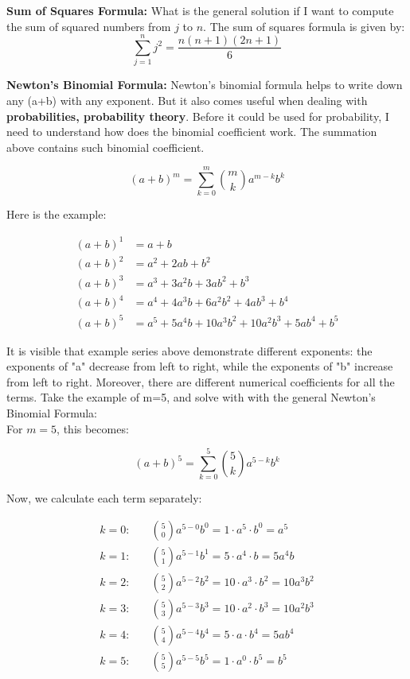 \documentclass{article}
\begin{document}
\vspace{1cm}

\textbf{Sum of Squares Formula: }
What is the general solution if I want to compute the sum of squared numbers from \(j\) to \(n\). The sum of squares formula is given by:
\begin{equation}
\sum_{j=1}^{n} j^2 = \frac{n(n+1)(2n+1)}{6}
\end{equation}

\vspace{1cm}

\textbf{Newton's Binomial Formula:} Newton's binomial formula helps to write down any (a+b) with any exponent. But it also comes useful when dealing with \textbf{probabilities, probability theory}. Before it could be used for probability, I need to understand how does the binomial coefficient work. The summation above contains such binomial coefficient.    

\begin{equation}
(a+b)^m = \sum_{k=0}^{m} \binom{m}{k} a^{m-k} b^{k}
\end{equation}

Here is the example: 

\begin{align*}
(a + b)^1 &= a + b \\
(a + b)^2 &= a^2 + 2ab + b^2 \\
(a + b)^3 &= a^3 + 3a^2b + 3ab^2 + b^3 \\
(a + b)^4 &= a^4 + 4a^3b + 6a^2b^2 + 4ab^3 + b^4 \\
(a + b)^5 &= a^5 + 5a^4b + 10a^3b^2 + 10a^2b^3 + 5ab^4 + b^5
\end{align*}

It is visible that example series above demonstrate different exponents: the exponents of "a" decrease from left to right, while the exponents of "b" increase from left to right. Moreover, there are different numerical coefficients for all the terms. Take the example of m=5, and solve with with the general Newton's Binomial Formula: \\

For \(m = 5\), this becomes:

\begin{equation*}
(a + b)^5 = \sum_{k=0}^{5} \binom{5}{k} a^{5-k} b^{k}
\end{equation*}

Now, we calculate each term separately:

\begin{align*}
k = 0: & \quad \binom{5}{0} a^{5-0} b^{0} = 1 \cdot a^5 \cdot b^0 = a^5 \\[8pt]
k = 1: & \quad \binom{5}{1} a^{5-1} b^{1} = 5 \cdot a^4 \cdot b = 5a^4 b \\[8pt]
k = 2: & \quad \binom{5}{2} a^{5-2} b^{2} = 10 \cdot a^3 \cdot b^2 = 10a^3 b^2 \\[8pt]
k = 3: & \quad \binom{5}{3} a^{5-3} b^{3} = 10 \cdot a^2 \cdot b^3 = 10a^2 b^3 \\[8pt]
k = 4: & \quad \binom{5}{4} a^{5-4} b^{4} = 5 \cdot a \cdot b^4 = 5a b^4 \\[8pt]
k = 5: & \quad \binom{5}{5} a^{5-5} b^{5} = 1 \cdot a^0 \cdot b^5 = b^5
\end{align*}
\end{document}
